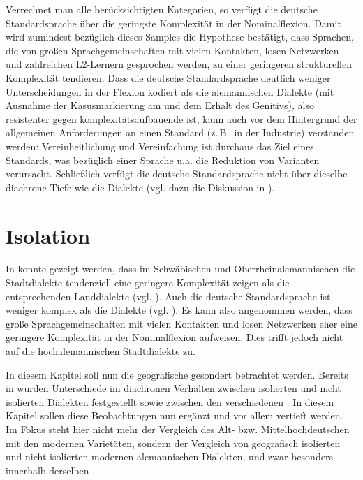 Verrechnet man alle berücksichtigten Kategorien, so verfügt die deutsche Standardsprache über die geringste Komplexität in der Nominalflexion. Damit wird zumindest bezüglich dieses Samples die Hypothese bestätigt, dass Sprachen, die von großen Sprachgemeinschaften mit vielen Kontakten, losen Netzwerken und zahlreichen L2-Ler\-nern gesprochen werden, zu einer geringeren strukturellen Komplexität tendieren. Dass die deutsche Standardsprache deutlich weniger Unterscheidungen in der Flexion kodiert als die alemannischen Dialekte (mit Ausnahme der Kasusmarkierung am  und dem Erhalt des Genitivs), also resistenter gegen komplexitätsaufbauende  ist, kann auch vor dem Hintergrund der allgemeinen Anforderungen an einen Standard (z.\,B.\ in der Industrie) verstanden werden: Vereinheitlichung und Vereinfachung ist durchaus das Ziel eines Standards, was bezüglich einer Sprache u.a. die Reduktion von Varianten verursacht. Schließlich verfügt die deutsche Standardsprache nicht über dieselbe diachrone Tiefe wie die Dialekte (vgl. dazu die Diskussion in ).

\section{Isolation}\label{6.5}

In  konnte gezeigt werden, dass im Schwäbischen und Oberrheinalemannischen die Stadtdialekte tendenziell eine geringere Komplexität zeigen als die entsprechenden Landdialekte (vgl. ). Auch die deutsche Standardsprache ist weniger komplex als die Dialekte (vgl. ). Es kann also angenommen werden, dass große Sprachgemeinschaften mit vielen Kontakten und losen Netzwerken eher eine geringere Komplexität in der Nominalflexion aufweisen. Dies trifft jedoch nicht auf die hochalemannischen Stadtdialekte zu.

In diesem Kapitel soll nun die geografische  gesondert betrachtet werden. Bereits in  wurden Unterschiede im diachronen Verhalten zwischen isolierten und nicht isolierten Dialekten festgestellt sowie zwischen den verschiedenen . In diesem Kapitel sollen diese Beobachtungen nun ergänzt und vor allem vertieft werden. Im Fokus steht hier nicht mehr der Vergleich des Alt- bzw. Mittelhochdeutschen mit den modernen Varietäten, sondern der Vergleich von geografisch isolierten und nicht isolierten modernen alemannischen Dialekten, und zwar besonders innerhalb derselben .

